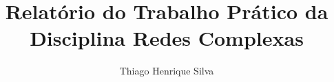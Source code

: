 \title{Relatório do Trabalho Prático da Disciplina Redes Complexas}

\author{Thiago Henrique Silva}


\address{Departamento de Ciência da Computação\\
   Universidade Federal de Minas Gerais (UFMG)\\
   31.270-010 -- Belo Horizonte -- MG -- Brasil
}                                                                      

\maketitle
